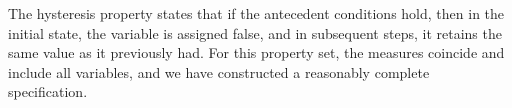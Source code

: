 \noindent The hysteresis property states that if the antecedent conditions hold, then in the initial state, the {\small{\doion}}
variable is assigned false, and in subsequent steps, it retains the same value as it previously had.  %
For this property set, the measures coincide and include all variables, and we have constructed a reasonably complete specification.

%
